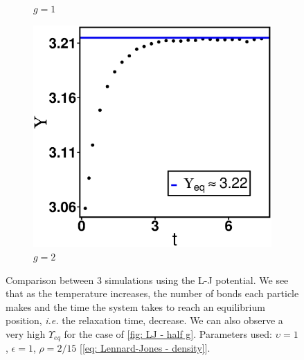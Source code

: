 \documentclass[../../main.tex]{subfiles}
\begin{document}
\begin{figure}[h]
\begin{subfigure}[b]{0.328\textwidth}
                \caption{$g = 1$}
                \label{fig: LJ - one g}
            \end{subfigure}
            \begin{subfigure}[b]{0.328\textwidth}
                \centering
                \includegraphics[width=\textwidth]{Figures/lj_twog.eps}
                \caption{$g = 2$}
                \label{fig: LJ - two g}
            \end{subfigure}
            \caption{Comparison between 3 simulations using the L-J potential. We see that as the temperature increases, the number of bonds each particle makes and the time the system takes to reach an equilibrium position, \textit{i.e.} the relaxation time, decrease. We can also observe a very high $\Upsilon_{eq}$ for the case of \cref{fig: LJ - half g}. Parameters used: $\upsilon = 1$, $\epsilon = 1$, $\rho = 2/15$ [\cref{eq: Lennard-Jones - density}].}
            \label{fig: L-J temperature in number of bonds}
        \end{figure}
        
\end{document}
